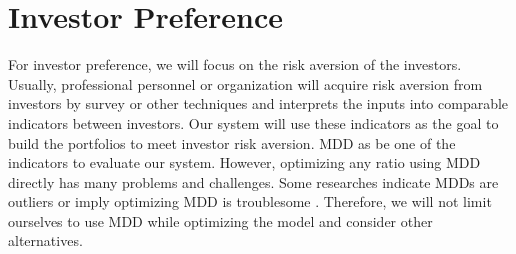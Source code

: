 \section{Investor Preference}
For investor preference, we will focus on the risk aversion of the investors. Usually, professional personnel or organization will acquire risk aversion from investors by survey or other techniques and interprets the inputs into comparable indicators between investors. Our system will use these indicators as the goal to build the portfolios to meet investor risk aversion. MDD as be one of the indicators to evaluate our system. However, optimizing any ratio using MDD directly has many problems and challenges. Some researches indicate MDDs are outliers \cite {johansen2002large, johansen1998stock} or imply optimizing MDD is troublesome \cite{moody1998performance}. Therefore, we will not limit ourselves to use MDD while optimizing the model and consider other alternatives. 